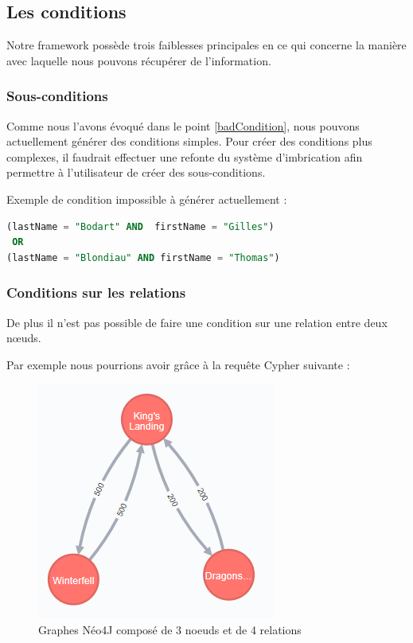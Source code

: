 \documentclass[a4paper,fleqn,12pt]{report}
\begin{document}
\subsection{Les conditions}

Notre framework possède trois faiblesses principales en ce qui concerne la manière avec laquelle nous pouvons récupérer de l'information.

\subsubsection*{\bf Sous-conditions}

Comme nous l'avons évoqué dans le point \ref{badCondition}, nous pouvons actuellement générer des conditions simples.
Pour créer des conditions plus complexes, il faudrait effectuer une refonte du système d'imbrication afin permettre à l'utilisateur de créer des sous-conditions. 

Exemple de condition impossible à générer actuellement :
\begin{lstlisting}[language=SQL]
(lastName = "Bodart" AND  firstName = "Gilles") 
 OR 
(lastName = "Blondiau" AND firstName = "Thomas")
\end{lstlisting}


\subsubsection*{\bf Conditions sur les relations}
De plus il n'est  pas possible de faire une condition sur une relation entre deux nœuds. 

Par exemple nous pourrions avoir grâce à la requête Cypher suivante : 

\begin{figure}[!ht]
\centering
\includegraphics[scale=0.8]{figures/citiesRel.png}
\caption{Graphes Néo4J composé de 3 noeuds et de 4 relations}
\label{fig:citiesRel}
\end{figure}
 
\end{document}
